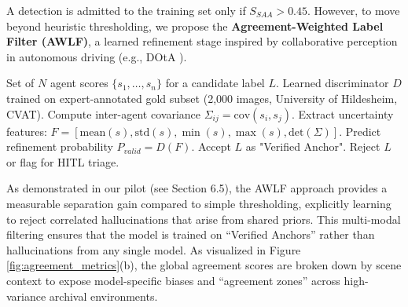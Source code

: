 \documentclass[12pt,onecolumn,a4paper]{IEEEtran}
\begin{document}
A detection is admitted to the training set only if $S_{SAA} > 0.45$. However, to move beyond heuristic thresholding, we propose the \textbf{Agreement-Weighted Label Filter (AWLF)}, a learned refinement stage inspired by collaborative perception in autonomous driving (e.g., DOtA \cite{xia2025dota}).

\begin{algorithm}
\caption{Agreement-Weighted Label Filter (AWLF)}
\begin{algorithmic}[1]
\Require Set of $N$ agent scores $\{s_1, \dots, s_n\}$ for a candidate label $L$.
\Require Learned discriminator $D$ trained on expert-annotated gold subset (2{,}000 images, University of Hildesheim, CVAT).
\State Compute inter-agent covariance $\Sigma_{ij} = \text{cov}(s_i, s_j)$.
\State Extract uncertainty features: $F = [\text{mean}(s), \text{std}(s), \min(s), \max(s), \text{det}(\Sigma)]$.
\State Predict refinement probability $P_{valid} = D(F)$.
    \State Accept $L$ as "Verified Anchor".
\Else
    \State Reject $L$ or flag for HITL triage.
\EndIf
\end{algorithmic}
\end{algorithm}

As demonstrated in our pilot (see Section 6.5), the AWLF approach provides a measurable separation gain compared to simple thresholding, explicitly learning to reject correlated hallucinations that arise from shared priors. This multi-modal filtering ensures that the model is trained on ``Verified Anchors'' rather than hallucinations from any single model. As visualized in Figure \ref{fig:agreement_metrics}(b), the global agreement scores are broken down by scene context to expose model-specific biases and ``agreement zones'' across high-variance archival environments.
\end{document}

